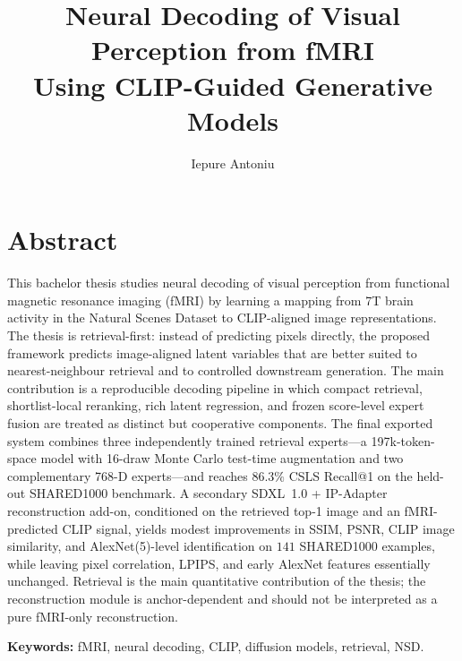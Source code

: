 \documentclass[12pt]{report}
\begin{document}
\title{Neural Decoding of Visual Perception from fMRI\\Using CLIP-Guided Generative Models}
\author{Iepure Antoniu}

\maketitle
{}

\chapter*{Abstract}

This bachelor thesis studies neural decoding of visual perception from functional magnetic resonance imaging (fMRI) by learning a mapping from 7T brain activity in the Natural Scenes Dataset to CLIP-aligned image representations. The thesis is retrieval-first: instead of predicting pixels directly, the proposed framework predicts image-aligned latent variables that are better suited to nearest-neighbour retrieval and to controlled downstream generation. The main contribution is a reproducible decoding pipeline in which compact retrieval, shortlist-local reranking, rich latent regression, and frozen score-level expert fusion are treated as distinct but cooperative components. The final exported system combines three independently trained retrieval experts---a 197k-token-space model with 16-draw Monte Carlo test-time augmentation and two complementary 768-D experts---and reaches $86.3\%$ CSLS Recall@1 on the held-out SHARED1000 benchmark. A secondary SDXL~1.0 + IP-Adapter reconstruction add-on, conditioned on the retrieved top-1 image and an fMRI-predicted CLIP signal, yields modest improvements in SSIM, PSNR, CLIP image similarity, and AlexNet(5)-level identification on $141$ SHARED1000 examples, while leaving pixel correlation, LPIPS, and early AlexNet features essentially unchanged. Retrieval is the main quantitative contribution of the thesis; the reconstruction module is anchor-dependent and should not be interpreted as a pure fMRI-only reconstruction.

\textbf{Keywords:} fMRI, neural decoding, CLIP, diffusion models, retrieval, NSD.

\tableofcontents
\newpage
{}










\end{document}
